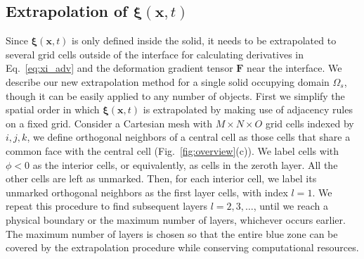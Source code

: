 \documentclass[times, 10pt]{article}
\renewcommand{\vec}[1]{\mathbf{#1}}
\newcommand{\vu}{\vec{u}}
\newcommand{\vx}{\vec{x}}
\newcommand{\vF}{\vec{F}}
\newcommand{\vxi}{\boldsymbol\xi}
\newcommand{\vtau}{\boldsymbol\tau}
\newcommand{\trans}{\mathsf{T}}
\begin{document}
\begin{multicols}{2}
\iffalse
The artificial solid viscous stress tensor is
%
\begin{equation}
\label{eq:art_visc}
\vtau_a = \mu_a (1+\gamma_t \epsilon H'_\epsilon (\phi))  \left(\nabla \vu + \nabla\vu^\trans \right) \\
\end{equation}
%
We add $\vtau_a$ to the solid stress, which we blend with the fluid stress,
%
\begin{equation}
\label{eq:total_stress}
\vtau = H(\phi) \vtau_f + (1-H(\phi)) (\vtau_s + \vtau_a)
\end{equation}
\fi
%


%
\subsection*{Extrapolation of $\vxi(\vx,t )$}
Since $\vxi (\vx,t)$ is only defined inside the solid,
it needs to be extrapolated to several grid cells outside of the interface
for calculating derivatives in Eq.~\eqref{eq:xi_adv} and the deformation gradient tensor $\vF$ near the interface.
%
We describe our new extrapolation method for a single solid occupying domain $\Omega_{s}$, though it can be easily applied to any number of objects.
First we simplify the spatial order in which $\vxi(\vx, t)$ is extrapolated by making use of adjacency rules on a fixed grid.
Consider a Cartesian mesh with $M\times N\times O$ grid cells indexed by $i, j, k$,
we define orthogonal neighbors of a central cell as those cells that share a common face with the central cell (Fig.~\ref{fig:overview}(c)).
We label cells with $\phi < 0$ as the interior cells, or equivalently, as cells in the zeroth layer.
All the other cells are left as unmarked.
Then, for each interior cell, we label its unmarked orthogonal neighbors as the first layer cells, with index $l=1$.
We repeat this procedure to find subsequent layers $l=2,3,\ldots$, until we reach a physical boundary or the maximum number of layers, whichever occurs earlier.
The maximum number of layers is chosen so that the entire blue zone can be covered by the extrapolation procedure while conserving computational resources.


\end{multicols}
\end{document}
